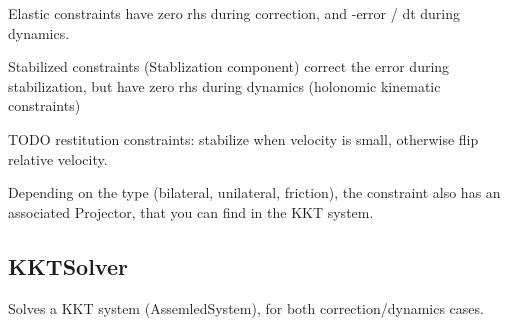 \documentclass{article}
\begin{document}
Elastic constraints have zero rhs during correction, and -error / dt
during dynamics.

Stabilized constraints (Stablization component) correct the error
during stabilization, but have zero rhs during dynamics (holonomic
kinematic constraints)

TODO restitution constraints: stabilize when velocity is small,
otherwise flip relative velocity.

Depending on the type (bilateral, unilateral, friction), the
constraint also has an associated Projector, that you can find in the
KKT system.

\subsection{KKTSolver}
Solves a KKT system (AssemledSystem), for both correction/dynamics cases.
\end{document}
